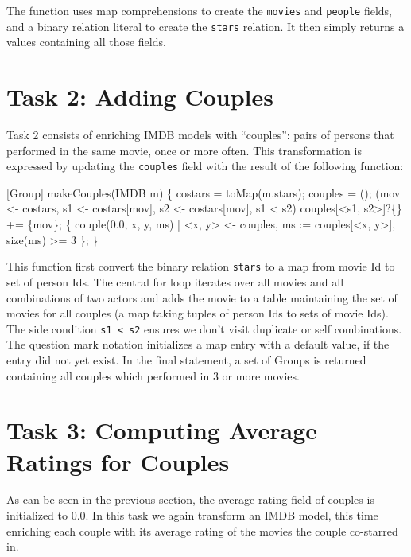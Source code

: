 \documentclass[submission,copyright,creativecommons]{eptcs}
\begin{document}
The function uses map comprehensions to create the \texttt{movies} and \texttt{people} fields, and a binary relation literal to create the \texttt{stars} relation. It then simply returns a values containing all those fields.



\section*{Task 2: Adding Couples}

Task 2 consists of enriching IMDB models with ``couples'': pairs of persons that performed in the same movie, once or more often. This transformation is expressed by updating the \texttt{couples} field with the result of the following function:

\begin{rascal}
[Group] makeCouples(IMDB m) \{{}
    costars = toMap(m.stars); couples = ();
     (mov \textless{}- costars, s1 \textless{}- costars{}[mov], s2 \textless{}- costars{}[mov], s1 \textless{} s2) 
       couples{}[\textless{}s1, s2\textgreater{}]?\{\} += \{{}mov\}{};
     \{{} couple(0.0, x, y, ms) 
                     | \textless{}x, y\textgreater{} \textless{}- couples, ms := couples{}[\textless{}x, y\textgreater{}], size(ms) \textgreater{}= 3 \}{};
\}{}
\end{rascal}

This function first convert the binary relation \texttt{stars} to a map from movie Id to set of person Ids. The central for loop iterates over all movies and all combinations of two actors and adds the movie to a table maintaining the set of movies for all couples (a map taking tuples of person Ids to sets of movie Ids). The side condition \texttt{s1 \textless{} s2} ensures we don't visit duplicate or self combinations.
The question mark notation initializes a map entry with a default value, if the entry did not yet exist.
In the final statement, a set of Groups is returned containing all couples which performed in 3 or more movies.




\section*{Task 3: Computing Average Ratings for Couples}

As can be seen in the previous section, the average rating field of couples is initialized to 0.0. In this task we again transform an IMDB model, this time enriching each couple with its average rating of the movies the couple co-starred in. 
\end{document}
